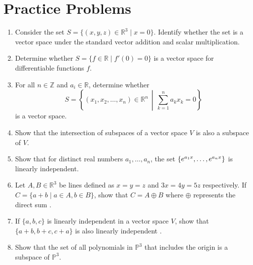 \documentclass[../../../main.tex]{subfiles}
\begin{document}
\section{Practice Problems}
\begin{enumerate}
\item
Consider the set $S = \{ (x, y, z) \in \mathbb{R}^3 \mid x = 0 \}$.
Identify whether the set is a vector space under the standard vector
addition and scalar multiplication.

\item
Determine whether $S = \{ f \in \mathbb{R} \mid f'(0) = 0 \}$
is a vector space for differentiable functions $f$.

\item
For all $n \in \mathbb{Z}$ and $a_i \in \mathbb{R}$, determine whether
\[
S =
\left\{
    (x_1, x_2, \ldots, x_n) \in \mathbb{R}^n
    \,\middle\vert\,
    \sum_{k = 1}^n a_k x_k = 0
\right\}
\]
is a vector space.

\item
Show that the intersection of subspaces of a vector space $V$
is also a subspace of $V$.

\item
Show that for distinct real numbers $a_1, \ldots, a_n$, the set
$\{ e^{a_1 x}, \ldots, \linebreak e^{a_n x} \}$ is linearly
independent.

\item
Let $A, B \in \mathbb{R}^3$ be lines defined as $x = y = z$ and
$3x = 4y = 5z$ respectively. If $C = \{ a + b \mid a \in A, b \in B
\}$, show that $C = A \oplus B$ where $\oplus$ represents the direct
sum \cite{MATH02-3}.

\item
If $\{ a, b, c \}$ is linearly independent in a vector space $V$,
show that $\{ a+b, b+c, c+a \}$ is also linearly independent
\cite{MATH02-3}.

\item
Show that the set of all polynomials in $\mathbb{P}^3$ that includes
the origin is a subspace of $\mathbb{P}^3$.
\end{enumerate}
\end{document}
